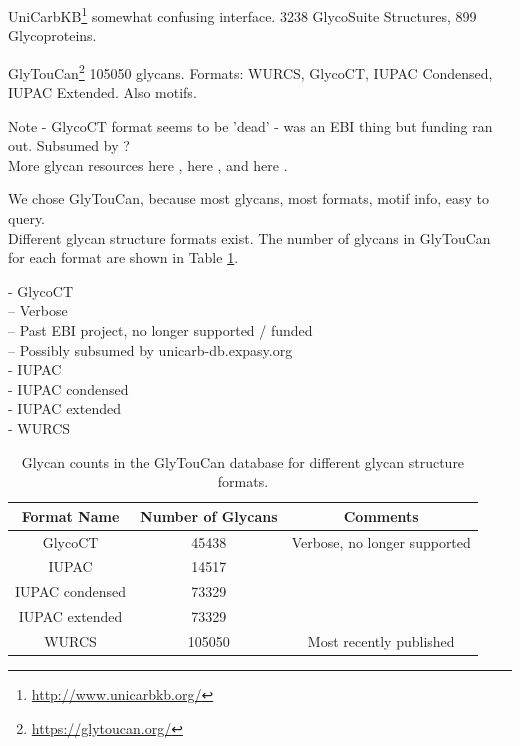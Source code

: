 \documentclass[12pt,a4paper]{article}
\begin{document}
UniCarbKB\footnote{\url{http://www.unicarbkb.org/}} somewhat confusing interface. 3238 GlycoSuite Structures, 899 Glycoproteins.

GlyTouCan\footnote{\url{https://glytoucan.org/}} 105050 glycans. Formats: WURCS, GlycoCT, IUPAC Condensed, IUPAC Extended. Also motifs.

Note - GlycoCT format seems to be 'dead' - was an EBI thing but funding ran out. Subsumed by  ? \\

More glycan resources here , here , and here .

We chose GlyTouCan, because most glycans, most formats, motif info, easy to query. \\

Different glycan structure formats exist. The number of glycans in GlyTouCan for each format are shown in Table \ref{tab:glycan_format_counts}.

- GlycoCT\\
-- Verbose\\
-- Past EBI project, no longer supported / funded\\
-- Possibly subsumed by unicarb-db.expasy.org\\
- IUPAC \\
- IUPAC condensed \\
- IUPAC extended \\
- WURCS \\

\begin{table}[h]
\centering
{}
\begin{tabular}{|c|c|c|} \hline
{\bf Format Name} & {\bf Number of Glycans} & {\bf Comments} \\ \hline
GlycoCT & 45438 & Verbose, no longer supported\\ \hline
IUPAC & 14517 & \\ \hline
IUPAC condensed & 73329 & \\ \hline
IUPAC extended & 73329 & \\ \hline
WURCS & 105050 & Most recently published \\ \hline
\end{tabular}
\caption{Glycan counts in the GlyTouCan database for different glycan structure formats.}
\label{tab:glycan_format_counts}
\end{table}
\end{document}

